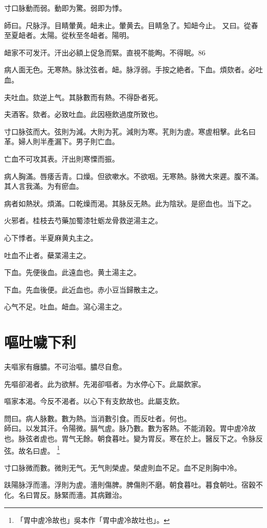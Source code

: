 \documentclass[12pt,twoside,UTF8,b5paper]{ctexbook}
\begin{document}
寸口脉動而弱。動即为驚。弱即为悸。

師曰。尺脉浮。目睛暈黄。衄未止。暈黄去。目睛急了。知衄今止。
又曰。從春至夏衄者。太陽。從秋至冬衄者。陽明。

衄家不可发汗。汗出必額上促急{而緊}。直視不能眴。不得眠。86

病人面无色。无寒熱。脉沈弦者。衄。{脉}浮弱。手按之絶者。下血。煩欬者。必吐血。

夫吐血。欬逆上气。其脉數而有熱。不得卧者死。

夫酒客。欬者。必致吐血。此因極飲過度所致也。

寸口脉弦而大。弦則为減。大則为芤。減則为寒。芤則为虗。寒虗相擊。此名曰革。婦人則半產漏下。男子則亡血。

亡血不可攻其表。汗出則寒慄而振。

病人胸滿。唇痿舌青。口燥。但欲嗽水。不欲咽。无寒熱。脉微大來遲。腹不滿。其人言我滿。为有瘀血。

病者如熱狀。煩滿。口乾燥而渴。其脉反无熱。此为陰狀。是瘀血也。当下之。

火邪者。桂枝去芍藥加蜀漆牡蛎龙骨救逆湯主之。

心下悸者。半夏麻黄丸主之。

吐血不止者。蘗枼湯主之。

下血。先便後血。此遠血也。黄土湯主之。

下血。先血後便。此近血也。赤小豆当歸散主之。

心气不足。吐血。衄血。瀉心湯主之。

\chapter{嘔吐噦下利}

夫嘔家有癰膿。不可治嘔。膿尽自愈。

先嘔卻渴者。此为欲觧。先渴卻嘔者。为水停心下。此屬飲家。

嘔家本渴。今反不渴者。以心下有支飲故也。此屬支飲。

問曰。病人脉數。數为熱。当消數引食。而反吐者。何也。\\
師曰。以发其汗。令陽微。膈气虗。脉乃數。數为客熱。不能消穀。胃中虗冷故也。脉弦者虗也。胃气无餘。朝食暮吐。變为胃反。寒在於上。醫反下之。令脉反弦。故名曰虗。
	\footnote{「胃中虗冷故也」吳本作「胃中虗冷故吐也」。}

寸口脉微而數。微則无气。无气則榮虗。榮虗則血不足。血不足則胸中冷。

趺陽脉浮而濇。浮則为虗。濇則傷脾。脾傷則不磨。朝食暮吐。暮食朝吐。宿穀不化。名曰胃反。脉緊而濇。其病難治。
\end{document}
